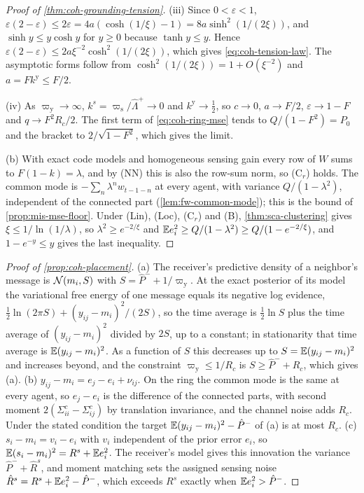 \begin{proof}[Proof of \cref{thm:coh-grounding-tension}]
(iii) Since $0<\varepsilon<1$, $\varepsilon(2-\varepsilon)\le2\varepsilon=4a(\cosh(1/\xi)-1)=8a\sinh^2(1/(2\xi))$, and $\sinh y\le y\cosh y$ for $y\ge0$ because $\tanh y\le y$. Hence $\varepsilon(2-\varepsilon)\le2a\xi^{-2}\cosh^2(1/(2\xi))$, which gives \eqref{eq:coh-tension-law}. The asymptotic forms follow from $\cosh^2(1/(2\xi))=1+O(\xi^{-2})$ and $a=Fk^{\mathrm y}\le F/2$.

(iv) As $\varpi_{\mathrm y}\to\infty$, $k^s=\varpi_{\mathrm s}/\hat\Lambda^+\to0$ and $k^{\mathrm y}\to\frac12$, so $c\to0$, $a\to F/2$, $\varepsilon\to1-F$ and $q\to F^2R_c/2$. The first term of \eqref{eq:coh-ring-mse} tends to $Q/(1-F^2)=P_0$ and the bracket to $2/\sqrt{1-F^2}$, which gives the limit.

(b) With exact code models and homogeneous sensing gain every row of $W$ sums to $F(1-k)=\lambda$, and by \textup{(NN)} this is also the row-sum norm, so \textup{(C$_r$)} holds. The common mode is $-\sum_n\lambda^nw_{t-1-n}$ at every agent, with variance $Q/(1-\lambda^2)$, independent of the connected part (\cref{lem:fw-common-mode}); this is the bound of \cref{prop:mis-mse-floor}. Under \textup{(Lin)}, \textup{(Loc)}, \textup{(C$_r$)} and \textup{(B)}, \cref{thm:sca-clustering} gives $\xi\le1/\ln(1/\lambda)$, so $\lambda^2\ge e^{-2/\xi}$ and $\mathbb{E} e_i^2\ge Q/(1-\lambda^2)\ge Q/(1-e^{-2/\xi})$, and $1-e^{-y}\le y$ gives the last inequality.
\end{proof}

\begin{proof}[Proof of \cref{prop:coh-placement}]
(a) The receiver's predictive density of a neighbor's message is $\mathcal{N}(m_i,S)$ with $S=\hat P^-+1/\varpi_{\mathrm y}$. At the exact posterior of its model the variational free energy of one message equals its negative log evidence, $\frac12\ln(2\pi S)+(y_{ij}-m_i)^2/(2S)$, so the time average is $\frac12\ln S$ plus the time average of $(y_{ij}-m_i)^2$ divided by $2S$, up to a constant; in stationarity that time average is $\mathbb{E}(y_{ij}-m_i)^2$. As a function of $S$ this decreases up to $S=\mathbb{E}(y_{ij}-m_i)^2$ and increases beyond, and the constraint $\varpi_{\mathrm y}\le1/R_c$ is $S\ge\hat P^-+R_c$, which gives (a). (b) $y_{ij}-m_i=e_j-e_i+\nu_{ij}$. On the ring the common mode is the same at every agent, so $e_j-e_i$ is the difference of the connected parts, with second moment $2(\Sigma^c_{ii}-\Sigma^c_{ij})$ by translation invariance, and the channel noise adds $R_c$. Under the stated condition the target $\mathbb{E}(y_{ij}-m_i)^2-\hat P^-$ of (a) is at most $R_c$. (c) $s_i-m_i=v_i-e_i$ with $v_i$ independent of the prior error $e_i$, so $\mathbb{E}(s_i-m_i)^2=R^s+\mathbb{E} e_i^2$. The receiver's model gives this innovation the variance $\hat P^-+\hat R^s$, and moment matching sets the assigned sensing noise $\hat R^s=R^s+\mathbb{E} e_i^2-\hat P^-$, which exceeds $R^s$ exactly when $\mathbb{E} e_i^2>\hat P^-$.
\end{proof}
